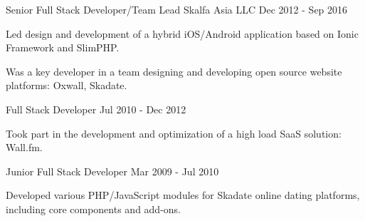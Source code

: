 \begin{cventries}

  \cventry
    {Senior Full Stack Developer/Team Lead} %
    {Skalfa Asia LLC} %
    {} %
    {Dec 2012 - Sep 2016} %
    {
      \begin{cvitems}
        \item Led design and development of a hybrid iOS/Android application based on Ionic Framework and SlimPHP.
        \item Was a key developer in a team designing and developing open source website platforms: Oxwall, Skadate.
      \end{cvitems}
    }

  \cventry
    {Full Stack Developer} %
    {} %
    {} %
    {Jul 2010 - Dec 2012} %
    {
      \begin{cvitems}
        \item Took part in the development and optimization of a high load SaaS solution: Wall.fm.
      \end{cvitems}
    }

  \cventry
    {Junior Full Stack Developer} %
    {} %
    {} %
    {Mar 2009 - Jul 2010} %
    {
      \begin{cvitems}
        \item Developed various PHP/JavaScript modules for Skadate online dating platforms, including core components and add-ons.
      \end{cvitems}
    }

\end{cventries}
